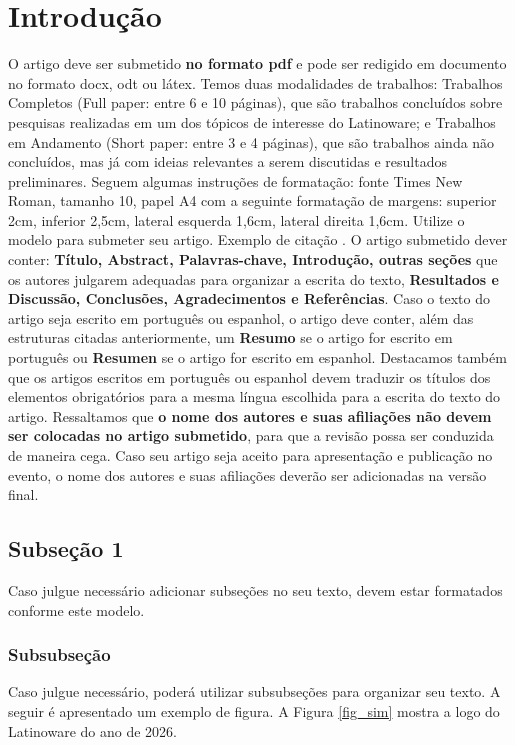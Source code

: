 \documentclass[10pt,conference]{IEEEtran}
\begin{document}
\section{Introdução}
O artigo deve ser submetido \textbf{no formato pdf} e pode ser redigido em documento no formato docx, odt ou látex. Temos duas modalidades de trabalhos: Trabalhos Completos (Full paper: entre 6 e 10 páginas), que são trabalhos concluídos sobre pesquisas realizadas em um dos tópicos de interesse do Latinoware; e Trabalhos em Andamento (Short paper: entre 3 e 4 páginas), que são trabalhos ainda não concluídos, mas já com ideias relevantes a serem discutidas e resultados preliminares. Seguem algumas instruções de formatação: fonte Times New Roman, tamanho 10, papel A4 com a seguinte formatação de margens: superior 2cm, inferior 2,5cm, lateral esquerda 1,6cm, lateral direita 1,6cm. Utilize o modelo para submeter seu artigo. Exemplo de citação \cite{nascimento2023aplicaccao}. O artigo submetido dever conter: \textbf{Título, Abstract, Palavras-chave, Introdução, outras  seções} que os autores julgarem adequadas para organizar a escrita do texto, \textbf{Resultados e Discussão, Conclusões, Agradecimentos e Referências}. Caso o texto do artigo seja escrito em português ou espanhol, o artigo deve conter, além das estruturas citadas anteriormente, um \textbf{Resumo} se o artigo for escrito em português ou \textbf{Resumen} se o artigo for escrito em espanhol. Destacamos também que os artigos escritos em português ou espanhol devem traduzir os títulos dos elementos obrigatórios para a mesma língua escolhida para a escrita do texto do artigo. Ressaltamos que  \textbf{o nome dos autores e suas afiliações não devem ser colocadas no artigo submetido}, para que a revisão possa ser conduzida de maneira cega. Caso seu artigo seja aceito para apresentação e publicação no evento, o nome dos autores e suas afiliações deverão ser adicionadas na versão final.

\subsection{Subseção 1}
Caso julgue necessário adicionar subseções no seu texto, devem estar formatados conforme este modelo.

\subsubsection{Subsubseção}
Caso julgue necessário, poderá utilizar subsubseções para organizar seu texto. A seguir é apresentado um exemplo de figura. A Figura \ref{fig_sim} mostra a logo do Latinoware do ano de 2026. 
\end{document}
